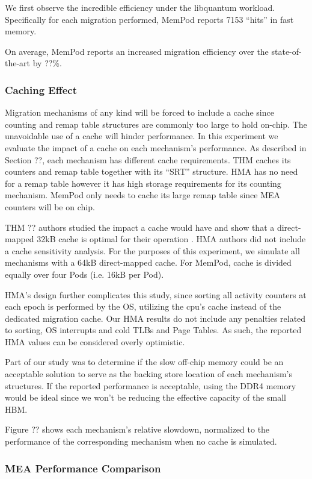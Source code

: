 We first observe the incredible efficiency under the libquantum workload. Specifically for each migration performed, MemPod reports 7153 ``hits'' in fast memory.

On average, MemPod reports an increased migration efficiency over the state-of-the-art by ??\%.

\subsubsection{Caching Effect}
Migration mechanisms of any kind will be forced to include a cache since counting and remap table structures are commonly too large to hold on-chip. The unavoidable use of a cache will hinder performance. In this experiment we evaluate the impact of a cache on each mechanism's performance. As described in Section ??, each mechanism has different cache requirements. THM caches its counters and remap table together with its ``SRT'' structure. HMA has no need for a remap table however it has high storage requirements for its counting mechanism. MemPod only needs to cache its large remap table since MEA counters will be on chip.

THM ?? authors studied the impact a cache would have and show that a direct-mapped 32kB cache is optimal for their operation . HMA authors did not include a cache sensitivity analysis. For the purposes of this experiment, we simulate all mechanisms with a 64kB direct-mapped cache. For MemPod, cache is divided equally over four Pods (i.e. 16kB per Pod).

HMA's design further complicates this study, since sorting all activity counters at each epoch is performed by the OS, utilizing the cpu's cache instead of the dedicated migration cache. Our HMA results do not include any penalties related to sorting, OS interrupts and cold TLBs and Page Tables. As such, the reported HMA values can be considered overly optimistic.

Part of our study was to determine if the slow off-chip memory could be an acceptable solution to serve as the backing store location of each mechanism's structures. If the reported performance is acceptable, using the DDR4 memory would be ideal since we won't be reducing the effective capacity of the small HBM.

Figure ?? shows each mechanism's relative slowdown, normalized to the performance of the corresponding mechanism when no cache is simulated. 

\subsubsection{MEA Performance Comparison}


